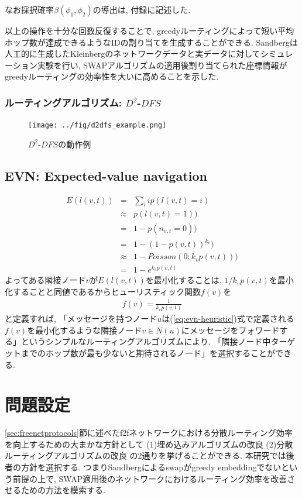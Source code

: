 \documentclass[dvipdfmx]{ampbt}
\begin{document}
   なお採択確率$\beta(\phi_1,\phi_2)$の導出は, 付録に記述した.

   以上の操作を十分な回数反復することで, greedyルーティングによって短い平均ホップ数が達成できるようなIDの割り当てを生成することができる. Sandbergは人工的に生成したKleinbergのネットワークデータと実データに対してシミュレーション実験を行い, SWAPアルゴリズムの適用後割り当てられた座標情報がgreedyルーティングの効率性を大いに高めることを示した.

   \subsubsection{ルーティングアルゴリズム: $D^2$-$DFS$}
   \begin{figure}[htbp]
    \centerline{\texttt{[image: ../fig/d2dfs\_example.png]}}
    \caption{$D^2$-$DFS$の動作例}
    \label{fig:d2dfs_example}
   \end{figure}

   \subsection{EVN: Expected-value navigation} \label{sec:evn}
    \begin{eqnarray}
     E(l(v,t)) &=& \sum_i ip(l(v,t)=i)\nonumber \\
     &\approx& p(l(v,t)=1)  )\nonumber\\
     &=& 1- p(n_{v,t}=0)  )\nonumber\\
     &=& 1- (1 - p(v,t))^{k_v} )\nonumber\\
     &\approx& 1 - Poisson(0; k_vp(v,t)) )\nonumber\\
     &=& 1- e^{k_vp(v,t)} \label{eq:evn-basic}
    \end{eqnarray}
    よってある隣接ノード$v$が$E(l(v,t))$を最小化することは, $1/k_vp(v,t)$を最小化することと同値であるからヒューリスティック関数$f(v)$を
    \begin{eqnarray}
     f(v) = \frac{1}{k_vp(v,t)}\label{eq:evn-heuristic}
    \end{eqnarray}
    と定義すれば, 「メッセージを持つノード$u$は(\ref{eq:evn-heuristic})式で定義される$f(v)$を最小化するような隣接ノード$v \in N(u)$にメッセージをフォワードする」というシンプルなルーティングアルゴリズムにより, 「隣接ノード中ターゲットまでのホップ数が最も少ないと期待されるノード」を選択することができる. 



\section{問題設定}
\ref{sec:freenetprotocols}節に述べた\acrshort{f2f}ネットワークにおける分散ルーティング効率を向上するための大まかな方針として (1)埋め込みアルゴリズムの改良 (2)分散ルーティングアルゴリズムの改良 の2通りを挙げることができる. 本研究では後者の方針を選択する. つまりSandbergによる\gls{swap}がgreedy embeddingでないという前提の上で, SWAP適用後のネットワークにおけるルーティング効率を改善させるための方法を模索する.
\end{document}
